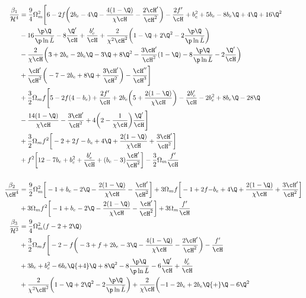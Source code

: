 \begin{align} 
\frac{\beta_{1}}{\mathcal{H}^{4}} &= \frac{9}{4}\Omega_{m}^{2}\Bigg[6-2f\bigg(2b_{e}-4\Q-\frac{4(1-\Q)}{\chi\cH}-\frac{2\cH'}{\cH^{2}}\bigg)-\frac{2f'}{\cH}+b_{e}^{2}+5b_{e}-8b_{e}\Q + 4\Q + 16\Q^{2} \nonumber\\ 
& - 16\frac{\p \Q}{\p \ln{\bar{L}}} - 8\frac{\Q'}{\cH} + \frac{b_{e}'}{\cH}+\frac{2}{\chi^{2}\cH^{2}}\bigg(1-\Q+2\Q^{2}-2\frac{\p \Q}{\p \ln{\bar{L}}}\bigg)
 \nonumber\\ 
& - \frac{2}{\chi\cH}\bigg(3+2b_{e}-2b_{e}\Q-3\Q +8\Q^{2}-\frac{3\cH'}{\cH^{2}}(1-\Q) -8\frac{\p \Q}{\p \ln{\bar{L}}} - 2\frac{\Q'}{\cH}\bigg) \nonumber \\
& + \frac{\cH'}{\cH^{2}}\bigg(-7-2b_{e}+8\Q+\frac{3\cH'}{\cH^{2}}\bigg) - \frac{\cH''}{\cH^{3}}\Bigg] \nonumber \\
&  +\frac{3}{2}\Omega_{m}f\Bigg[5-2f(4-b_{e})+\frac{2f'}{\cH}+2b_{e}\bigg(5+\frac{2(1-\Q)}{\chi\cH}\bigg)-\frac{2b_{e}'}{\cH} -2b_{e}^{2} + 8b_{e}\Q - 28\Q \nonumber \\
& - \frac{14(1-\Q)}{\chi\cH}-\frac{3\cH'}{\cH^{2}} +4\bigg(2-\frac{1}{\chi\cH}\bigg)\frac{\Q'}{\cH}\Bigg] \nonumber \\
&  +\frac{3}{2}\Omega_{m}f^{2}\bigg[-2+2f-b_{e}+4\Q+\frac{2(1-\Q)}{\chi\cH}+\frac{3\cH'}{\cH^{2}}\bigg] \nonumber \\
&  +f^{2}\bigg[12-7b_{e}+b_{e}^{2}+\frac{b_{e}'}{\cH}+(b_{e}-3)\frac{\cH'}{\cH^{2}}\bigg] - \frac{3}{2}\Omega_{m}\frac{f'}{\cH} \\
\nonumber\\
\frac{\beta_{2}}{\cH^{4}} &= \frac{9}{2}\Omega_{m}^{2}\bigg[-1+b_{e}-2\Q-\frac{2(1-\Q)}{\chi\cH}-\frac{\cH'}{\cH^{2}}\bigg] + 3\Omega_{m}f\bigg[-1+2f{-b_{e}}+4\Q+\frac{2(1-\Q)}{\chi\cH}+\frac{3\cH'}{\cH^{2}}\bigg] \nonumber \\
&  +3\Omega_{m}f^{2}\bigg[-1+b_{e}-2\Q-\frac{2(1-\Q)}{\chi\cH}-\frac{\cH'}{\cH^{2}}\bigg] + 3\Omega_{m}\frac{f'}{\cH}\; \\ 
\frac{\beta_{3}}{\mathcal{H}^{3}} &= \frac{9}{4}\Omega_{m}^{2}(f-2+2\Q) \nonumber \\
&  + \frac{3}{2}\Omega_{m}f\Bigg[-2 -f\bigg(-3+f+2b_{e}-3\Q-\frac{4(1-\Q)}{\chi\cH}-\frac{2\cH'}{\cH^{2}}\bigg)-\frac{f'}{\cH}\nonumber \\
& +{3}b_{e}+b_{e}^{2}-6b_{e}\Q{+4}\Q +8\Q^{2}-8\frac{\p \Q}{\p \ln{\bar{L}}} -6\frac{\Q'}{\cH} +\frac{b_{e}'}{\cH} \nonumber \\
& +\frac{2}{\chi^{2}\cH^{2}}\bigg(1-\Q+2\Q^{2}-2\frac{\p \Q}{\p \ln{\bar{L}}}\bigg) + \frac{2}{\chi \cH}\bigg({-1} -2b_{e}+2b_{e}\Q{+}\Q-6\Q^{2}  \nonumber \\

\end{align}
